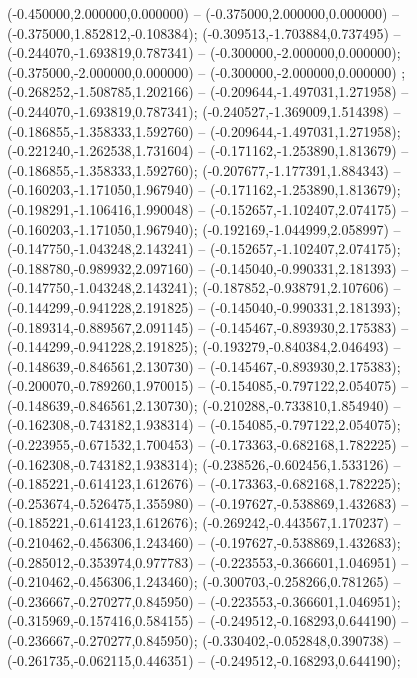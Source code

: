  (-0.450000,2.000000,0.000000) -- (-0.375000,2.000000,0.000000) -- (-0.375000,1.852812,-0.108384);
 (-0.309513,-1.703884,0.737495) -- (-0.244070,-1.693819,0.787341) -- (-0.300000,-2.000000,0.000000);
 (-0.375000,-2.000000,0.000000) -- (-0.300000,-2.000000,0.000000) ;
 (-0.268252,-1.508785,1.202166) -- (-0.209644,-1.497031,1.271958) -- (-0.244070,-1.693819,0.787341);
 (-0.240527,-1.369009,1.514398) -- (-0.186855,-1.358333,1.592760) -- (-0.209644,-1.497031,1.271958);
 (-0.221240,-1.262538,1.731604) -- (-0.171162,-1.253890,1.813679) -- (-0.186855,-1.358333,1.592760);
 (-0.207677,-1.177391,1.884343) -- (-0.160203,-1.171050,1.967940) -- (-0.171162,-1.253890,1.813679);
 (-0.198291,-1.106416,1.990048) -- (-0.152657,-1.102407,2.074175) -- (-0.160203,-1.171050,1.967940);
 (-0.192169,-1.044999,2.058997) -- (-0.147750,-1.043248,2.143241) -- (-0.152657,-1.102407,2.074175);
 (-0.188780,-0.989932,2.097160) -- (-0.145040,-0.990331,2.181393) -- (-0.147750,-1.043248,2.143241);
 (-0.187852,-0.938791,2.107606) -- (-0.144299,-0.941228,2.191825) -- (-0.145040,-0.990331,2.181393);
 (-0.189314,-0.889567,2.091145) -- (-0.145467,-0.893930,2.175383) -- (-0.144299,-0.941228,2.191825);
 (-0.193279,-0.840384,2.046493) -- (-0.148639,-0.846561,2.130730) -- (-0.145467,-0.893930,2.175383);
 (-0.200070,-0.789260,1.970015) -- (-0.154085,-0.797122,2.054075) -- (-0.148639,-0.846561,2.130730);
 (-0.210288,-0.733810,1.854940) -- (-0.162308,-0.743182,1.938314) -- (-0.154085,-0.797122,2.054075);
 (-0.223955,-0.671532,1.700453) -- (-0.173363,-0.682168,1.782225) -- (-0.162308,-0.743182,1.938314);
 (-0.238526,-0.602456,1.533126) -- (-0.185221,-0.614123,1.612676) -- (-0.173363,-0.682168,1.782225);
 (-0.253674,-0.526475,1.355980) -- (-0.197627,-0.538869,1.432683) -- (-0.185221,-0.614123,1.612676);
 (-0.269242,-0.443567,1.170237) -- (-0.210462,-0.456306,1.243460) -- (-0.197627,-0.538869,1.432683);
 (-0.285012,-0.353974,0.977783) -- (-0.223553,-0.366601,1.046951) -- (-0.210462,-0.456306,1.243460);
 (-0.300703,-0.258266,0.781265) -- (-0.236667,-0.270277,0.845950) -- (-0.223553,-0.366601,1.046951);
 (-0.315969,-0.157416,0.584155) -- (-0.249512,-0.168293,0.644190) -- (-0.236667,-0.270277,0.845950);
 (-0.330402,-0.052848,0.390738) -- (-0.261735,-0.062115,0.446351) -- (-0.249512,-0.168293,0.644190);
